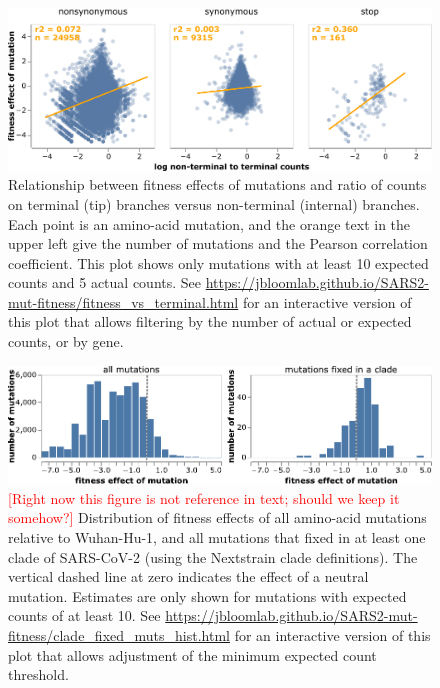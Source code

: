 \documentclass[9pt,twocolumn,twoside]{gsajnl_modified}
\newcommand\jdbcomment[1]{\textcolor{red}{[#1]}}
\begin{document}
\begin{figure}
\centering
\includegraphics[width=0.75\linewidth]{figs/terminal.png}
\caption{
Relationship between fitness effects of mutations and ratio of counts on terminal (tip) branches versus non-terminal (internal) branches.
Each point is an amino-acid mutation, and the orange text in the upper left give the number of mutations and the Pearson correlation coefficient.
This plot shows only mutations with at least 10 expected counts and 5 actual counts.
See \url{https://jbloomlab.github.io/SARS2-mut-fitness/fitness_vs_terminal.html} for an interactive version of this plot that allows filtering by the number of actual or expected counts, or by gene.
\label{fig:terminal}
}
\end{figure}

\begin{figure}
\centering
\includegraphics[width=0.7\linewidth]{figs/fixed_dist.pdf}
\caption{
\jdbcomment{Right now this figure is not reference in text; should we keep it somehow?}
Distribution of fitness effects of all amino-acid mutations relative to Wuhan-Hu-1, and all mutations that fixed in at least one clade of SARS-CoV-2 (using the Nextstrain clade definitions).
The vertical dashed line at zero indicates the effect of a neutral mutation.
Estimates are only shown for mutations with expected counts of at least 10.
See \url{https://jbloomlab.github.io/SARS2-mut-fitness/clade_fixed_muts_hist.html} for an interactive version of this plot that allows adjustment of the minimum expected count threshold.
\label{fig:fixed_dist}
}
\end{figure}
\end{document}
